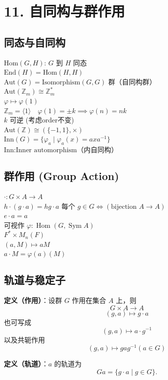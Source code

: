 \documentclass[12pt, a4paper]{article}
\begin{document}
\section*{11. 自同构与群作用}

\subsection*{同态与自同构}
$\text{Hom}(G, H)$: $G$ 到 $H$ 同态 \\
$\text{End}(H) = \text{Hom}(H, H)$ \\
$\text{Aut}(G) = \text{Isomorphism}(G, G)$ 群（自同构群） \\
$\text{Aut}(\mathbb{Z}_m) \cong \mathbb{Z}_m^*$ \\
$\varphi \mapsto \varphi(1)$ \\
$\mathbb{Z}_m = \langle 1 \rangle \quad \varphi(1) = \pm k \implies \varphi(n) = nk$ \\
$k$ 可逆 (考虑order不变)\\
$\text{Aut}(\mathbb{Z}) \cong (\{-1, 1\}, \times)$ \\
$\text{Inn}(G) = \{\varphi_a \mid \varphi_a(x) = axa^{-1}\}$ \\
$\text{Inn:Inner automorphism}$（内自同构）

\subsection*{群作用 (Group Action)}
$\cdot : G \times A \to A$ \\
$h \cdot (g \cdot a) = hg \cdot a$ \quad 每个 $g \in G \iff (\text{bijection } A \to A)$ \\
$e \cdot a = a$ \\
可视作 $\varphi:\operatorname{Hom}(G, \operatorname{Sym} A)$ \\
$F^* \times M_n(F)$ \\
$(a, M) \mapsto aM$ \\
$ a \cdot M = \varphi(a)(M) $

\subsection*{轨道与稳定子}

\textbf{定义（作用）}：设群 \(G\) 作用在集合 \(A\) 上，则
\[
G \times A \to A
\]
\[
(g, a) \mapsto g \cdot a
\]
也可写成
\[
(g, a) \mapsto a \cdot g^{-1}
\]
以及共轭作用
\[
(g, a) \mapsto gag^{-1} (a \in G)
\]

\textbf{定义（轨道）}：\(a\) 的轨道为
\[
Ga = \{g \cdot a \mid g \in G\}.
\]
\end{document}
